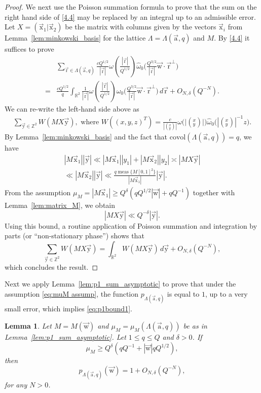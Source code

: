 \documentclass[letterpaper,11pt]{amsart}
\numberwithin{equation}{section}
\newtheorem{lemma}[theorem]{Lemma}
\theoremstyle{definition}
\numberwithin{equation}{section}
\newcommand{\Z}{\mathbb{Z}}
\renewcommand{\hat}{\widehat}
\newcommand{\ux}{{\vec{\mathrm{x}}}}
\newcommand{\ua}{\vec{\mathrm{a}}}
\newcommand{\ur}{\vec{\mathrm{r}}}
\newcommand{\uw}{{\vec{\mathrm{w}}}}
\newcommand{\uy}{{\vec{\mathrm{y}}}}
\DeclareMathOperator{\meas}{meas}
\renewcommand{\hat}{\widehat}
\newcommand{\R}{\mathbb{R}}
\begin{document}
\begin{proof}
We next use the Poisson summation formula to prove that  the sum on the right hand side of \eqref{4.4} may be replaced by an integral up to an admissible error. Let \(X = (\ux_1|\ux_2)\) be the matrix with columns given by the vectors  \(\ux_i\) from Lemma~\ref{lem:minkowski_basis} for the lattice $\Lambda=\Lambda(\ua,q)$ and $M$. By \eqref{4.4} it suffices to prove
\begin{align*}
&\sum_{{\ur\in\Lambda(\ua,q)}}
\frac{cQ^{1/2}}{|\ur|}
\omega\left(
\frac{ |\ur| }{ Q^{1/2}}
\right)
\hat{\omega}_0
\Big(
\frac{Q^{3/2}}{|\ur|} \uw\cdot\ur^\perp
\Big)
\\=&
\frac{cQ^{1/2}}{q}
\int_{\R^2}\frac{1}{|\ur|}
\omega\left(
\frac{ |\ur| }{ Q^{1/2}}
\right)
\hat{\omega}_0
\Big(
\frac{Q^{3/2}}{|\ur|} \uw\cdot\ur^\perp
\Big)\,d\ur
+O_{N,\delta}(Q^{-N}).
\end{align*}
 We can re-write the left-hand side above as
\begin{align*}
	\sum_{\uy\in \Z^2}
	W(M X\uy ),  \text{ where }
	W((x,y,z)^T)=\frac{c}{|({}^x_y)|}\omega\big( \lvert({}^x_y)\rvert\big) \hat{\omega}_0\big(|({}^x_y)|^{-1}z\big).
\end{align*}
By Lemma~\ref{lem:minkowski_basis} and the fact that $\mathrm{covol}(\Lambda(\ua, q))=q$, we have
\begin{align*}%
	|M\ux_1||\uy|
	\ll
	|M\ux_1||y_1|
	+
	|M\ux_2||y_2|
	\asymp
	|MX\uy|\\\ll |M\ux_2||\uy|\ll
	\frac{
		q\meas\{ M [0,1]^2 \}}
	{
		|M\ux_1|}|\uy|.
\end{align*}
From the assumption \(\mu_M = |M\ux_1| \geq  Q^{\delta} ( qQ^{1/2}|\uw|  + qQ^{-1}) \) together with Lemma~\ref{lem:matrix_M}, we obtain
\[
|MX\uy|\ll
Q^{-\delta}|\uy|.
\]
Using this bound, a routine application of Poisson summation and integration by parts (or ``non-stationary phase'') shows that
\begin{equation*}
	\sum_{\uy\in \Z^2}
W(MX\uy )
=
\int_{\R^2}
W(MX\uy )\,d\uy
+O_{N,\delta}(Q^{-N}),
\end{equation*}
which concludes the result. 
\end{proof}
Next we apply Lemma~\ref{lem:p1_sum_asymptotic} to prove that under the assumption \eqref{eq:muM assump}, the function $p_{\Lambda(\ua,q)}$ is equal to $1$, up to a very small error, which implies \eqref{eq:p1bound1}.
\begin{lemma}\label{lem:1}
Let $M=M(\uw)$ and $\mu_{M}=\mu_M (\Lambda(\ua, q))$ be as in Lemma~\ref{lem:p1_sum_asymptotic}. Let $1\leq q\leq Q$ and  $\delta>0$. If
	\[
	\mu_M\geq
	Q^{\delta}(qQ^{-1}+|\uw|qQ^{1/2}),
	\]
	then
	\[
	p_{\Lambda(\ua,q)}(\uw)
	=1+O_{N,\delta}(Q^{-N}),
	\]
	for any $N>0$.
\end{lemma}
\end{document}
